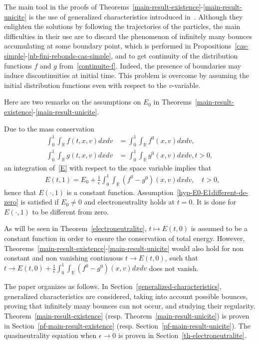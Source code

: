 \documentclass[AHL,Unicode,longabstracts,published]{cedram}
\newcommand{\R}{\mathbb{R}}
\begin{document}
The main tool in the proofs of Theorems~\ref{main-result-existence}-\ref{main-result-unicite} is the use of generalized characteristics introduced in~\cite{Guo95}. Although they enlighten the solutions by following the trajectories of the particles, the main difficulties in their use are to discard the phenomenon of infinitely many bounces accumulating at some boundary point, which is performed in Propositions~\ref{cas-simple}-\ref{nb-fini-rebonds-cas-simple}, and to get continuity of the distribution functions $f$ and $g$ from~\eqref{continuite-f}. Indeed, the presence of boundaries may induce discontinuities at initial time. This problem is overcome by assuming the initial distribution functions even with respect to the $v$-variable.


Here are two remarks on the assumptions on $E_0$ in Theorems~\ref{main-result-existence}-\ref{main-result-unicite}.
\begin{rema}
Due to the mass conservation
\begin{align*}
\int _0^1\int _\R f(t,x,v)dxdv &= \int _0^1\int _\R f^0(x,v)dxdv,\\
\int _0^1\int _\R g(t,x,v)dxdv &= \int _0^1\int _\R g^0(x,v)dxdv, t>0,
\end{align*}
an integration of~\eqref{E} with respect to the space variable implies that
\begin{align*}
&E(t,1)= E_0+\frac{1}{\epsilon }\int _0^1\int _\R \left(f^0-g^0\right)(x,v)dxdv,\quad t>0,
\end{align*}
hence that $E(\cdot,1)$ is a constant function. Assumption~\eqref{hyp-E0-E1different-de-zero} is satisfied if $E_0\neq 0$ and electroneutrality holds at $t=0$. It is done for $E(\cdot,1)$ to be different from zero.
\end{rema}
\begin{rema}
As will be seen in Theorem~\ref{electroneutralite}, $t \mapsto E(t,0)$ is assumed to be a constant function in order to ensure the conservation of total energy. However, Theorems~\ref{main-result-existence}-\ref{main-result-unicite} would also hold for non constant and non vanishing continuous $t\rightarrow E(t,0)$, such that $t\rightarrow E(t,0)+\frac{1}{\epsilon }\int _0^1\int _\R (f^0-g^0)(x,v)dxdv$ does not vanish.
\end{rema}

The paper organizes as follows. In Section~\ref{generalized-characteristics}, generalized characteristics are considered, taking into account possible bounces, proving that infinitely many bounces can not occur, and studying their regularity. Theorem~\ref{main-result-existence} (resp. Theorem~\ref{main-result-unicite}) is proven in Section~\ref{pf-main-result-existence} (resp. Section~\ref{pf-main-result-unicite}). The quasineutrality equation when $\epsilon
\to 0$ is proven in Section~\ref{th-electroneutralite}.
\end{document}

